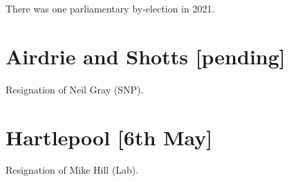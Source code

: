 \documentclass[a4paper,openany]{book}
\begin{document}
There was one parliamentary by-election in 2021.

%
%
%
%
%
%
\section*{Airdrie and Shotts \hspace*{\fill}\nolinebreak[1]%
	\enspace\hspace*{\fill}
	[pending]}


Resignation of Neil Gray (SNP).

\section*{Hartlepool \hspace*{\fill}\nolinebreak[1]%
\enspace\hspace*{\fill}
[6th May]}


Resignation of Mike Hill (Lab).


\end{document}
